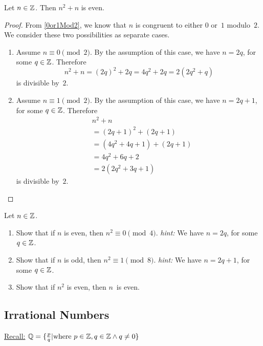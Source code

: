 \documentclass[../MATH-2000-Notes.tex]{subfiles}
\begin{document}
\begin{Proposition}
    {}\label{n2+nEven}
    Let $n \in \mathbb{Z}$. Then $n^2 + n$ is even.
\end{Proposition}
\begin{proof}
    From \ref{0or1Mod2}, we know that $n$ is congruent to either $0$ or~$1$ modulo~$2$. We consider these two possibilities as separate cases.

    \begin{enumerate}
        \item
              Assume $n \equiv 0 \pmod 2$.
              By the assumption of this case, we have $n = 2q$, for some $q \in \mathbb{Z}$. Therefore
              $$ n^2 + n = (2q)^2 + 2q = 4q^2 + 2q = 2(2q^2 + q)$$
              is divisible by~$2$.
        \item
              Assume $n \equiv 1 \pmod 2$.
              By the assumption of this case, we have $n = 2q+1$, for some $q \in \mathbb{Z} $. Therefore
              \begin{align*}
                &n^2 + n \\
                &= (2q+1)^2 + (2q+1) \\
                &= (4q^2 + 4q + 1) + (2q+ 1) \\
                &= 4q^2 + 6q + 2 \\
                &= 2(2q^2 + 3q + 1)
            \end{align*}
              is divisible by~$2$.
    \end{enumerate}
\end{proof}

Let $n \in \mathbb{Z}$.
\begin{enumerate}
\item \label{SquareMod4or8Ex-even}
Show that if $n$ is even, then $n^2 \equiv 0 \pmod{4}$.
{\textit{hint:} We have $n = 2q$, for some $q \in \mathbb{Z}$.}
\item \label{SquareMod4or8Ex-odd}
Show that if $n$ is odd, then $n^2 \equiv 1 \pmod{8}$.
{\textit{hint:} We have $n = 2q+1$, for some $q \in \mathbb{Z}$.}
\item \label{SquareMod4or8Ex-squareeven}
Show that if $n^2$ is even, then $n$~is even.
\end{enumerate}


\subsection{Irrational Numbers}
\underline{Recall:} \(\mathbb{Q} = \{\frac{p}{q}|\text{where}\ p\in\mathbb{Z}, q\in\mathbb{Z} \wedge q\neq 0\}\)
\end{document}
